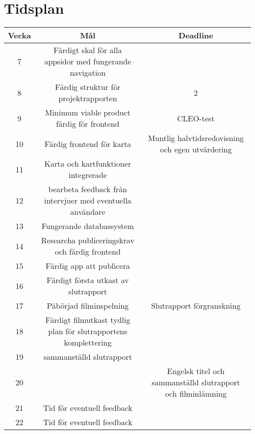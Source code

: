 
\section{Tidsplan}
\begin{landscape}

\begin{center}
    \begin{tabular}{|c|c|c|}
      \hline
      \textbf{Vecka} & \textbf{Mål} & \textbf{Deadline} \\
      \hline
        7 &  Färdigt skal för alla appsidor med fungerande navigation &   \\
      \hline
        8 &  Färdig struktur för projektrapporten &  2 \\
      \hline
        9 &  Minimum viable product färdig för frontend  &  CLEO-test \\
      \hline
       10 &  Färdig frontend för karta &  Muntlig halvtidsredovisning och egen utvärdering \\
      \hline
       11 &  Karta och kartfunktioner integrerade &   \\
      \hline
       12 & bearbeta feedback från intervjuer med eventuella användare &  \\
      \hline
        13 &  Fungerande databassystem  &   \\
      \hline
       14 &  Researcha publiceringskrav och färdig frontend &   \\
      \hline
       15 &  Färdig app att publicera &   \\
      \hline
       16 &  Färdigt första utkast av slutrapport &   \\
       \hline
       17 & Påbörjad filminspelning  &  Slutrapport förgranskning \\
       \hline
       18 &  Färdigt filmutkast tydlig plan för slutrapportens komplettering &   \\
       \hline
       19 & sammanställd slutrapport &  \\
       \hline
       20 &   &  Engelsk titel och sammanställd slutrapport och filminlämning\\
       \hline
       21 &  Tid för eventuell feedback &  \\
       \hline
       22 &  Tid för eventuell feedback  &   \\
      \hline
    \end{tabular}
  \end{center}

\end{landscape}